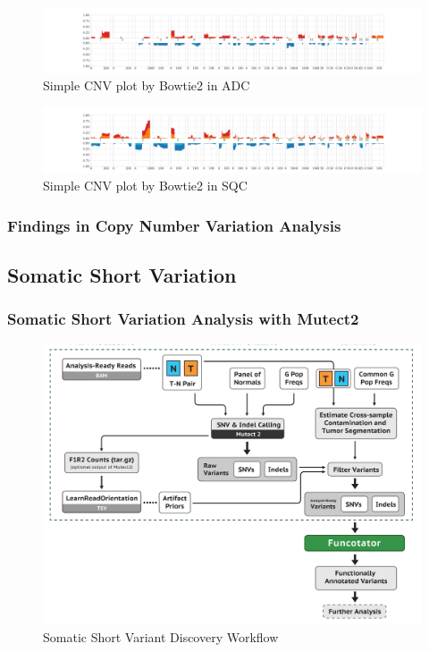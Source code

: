 \documentclass[a4paper]{article}
\begin{document}
                \begin{figure}[htbp]
                    \centering
                    \includegraphics[width=\linewidth]{figures/Sequenza/Bowtie2-simple-ADC.pdf}
                    \caption{Simple CNV plot by Bowtie2 in ADC}
                    \label{fig:SimpleCNV-Bowtie2-ADC}
                \end{figure}

                \begin{figure}[htbp]
                    \centering
                    \includegraphics[width=\linewidth]{figures/Sequenza/Bowtie2-simple-SQC.pdf}
                    \caption{Simple CNV plot by Bowtie2 in SQC}
                    \label{fig:SimpleCNV-Bowtie2-SQC}
                \end{figure}

            \subsubsection{Findings in Copy Number Variation Analysis}

        \subsection{Somatic Short Variation}
            \subsubsection{Somatic Short Variation Analysis with Mutect2}
                \begin{figure}[htbp]
                    \centering
                    \includegraphics[width=0.6 \linewidth]{figures/Workflow/somatic_short_variants.png}
                    \caption{Somatic Short Variant Discovery Workflow \protect\cite{gatk1, gatk2}}
                    \label{fig:Mutect2}
                \end{figure}
\end{document}
